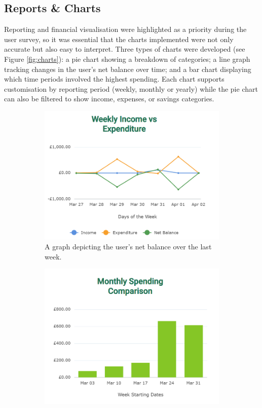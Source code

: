 \documentclass{l4proj}
\begin{document}
\subsection{Reports \& Charts}
Reporting and financial visualisation were highlighted as a priority during the user survey, so it was essential that the charts implemented were not only accurate but also easy to interpret. Three types of charts were developed (see Figure \ref{fig:charts}): a pie chart showing a breakdown of categories; a line graph tracking changes in the user's net balance over time; and a bar chart displaying which time periods involved the highest spending. Each chart supports customisation by reporting period (weekly, monthly or yearly) while the pie chart can also be filtered to show income, expenses, or savings categories.

\begin{figure}[htb] 
    \centering
    \begin{subfigure}[b]{0.3\textwidth}
        \includegraphics[width=\textwidth]{images/UI-Screenshots/line-graph.png}
        \caption{A graph depicting the user's net balance over the last week.}
        \label{fig:line-graph}
    \end{subfigure}
    \hspace{0.5em}
    \begin{subfigure}[b]{0.3\textwidth}
        \includegraphics[width=\textwidth]{images/UI-Screenshots/bar-graph.png}

\end{subfigure}
\end{figure}
\end{document}
